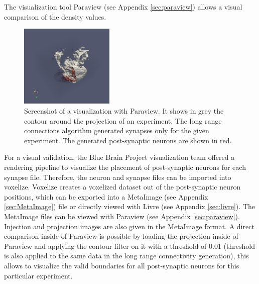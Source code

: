 The visualization tool Paraview (see Appendix \ref{sec:paraview}) allows a visual comparison of the density values.
 \begin{figure}[ht!]
\centering
\includegraphics[width=0.4\textwidth]{pictures/paraview_ex.png}
\caption{Screenshot of a visualization with Paraview. It shows in grey the contour around the projection of an experiment.
The long range connections algorithm generated synapses only for the given experiment. 
The generated post-synaptic neurons are shown in red.}
\label{fig:paraviewex}
\end{figure}
For a visual validation, the Blue Brain Project visualization team offered a rendering pipeline to visualize the placement of post-synaptic neurons for each synapse file. Therefore, the neuron and synapse files can be imported into 
voxelize. Voxelize creates a voxelized dataset out of the post-synaptic neuron positions, which can be exported into
a MetaImage (see Appendix \ref{sec:MetaImage}) file or directly viewed with Livre (see Appendix \ref{sec:livre}).
The MetaImage files can be viewed with Paraview (see Appendix \ref{sec:paraview}).
Injection and projection images are also given in the MetaImage format.
A direct comparison inside of Paraview is possible by
loading the projection inside of Paraview and applying the contour filter on it with a threshold of $0.01$ (threshold is also applied to the same data in the long range connectivity generation), this allows to visualize the valid boundaries for all post-synaptic neurons for this particular experiment.
 
